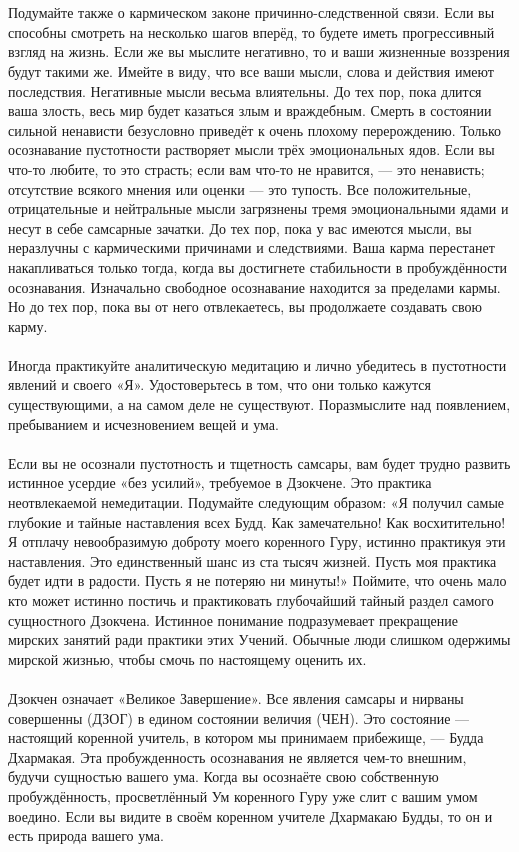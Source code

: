 \\ \\ Подумайте также о кармическом законе причинно-следственной связи. Если вы способны смотреть на несколько шагов вперёд, то будете иметь прогрессивный взгляд на жизнь. Если же вы мыслите негативно, то и ваши жизненные воззрения будут такими же. Имейте в виду, что все ваши мысли, слова и действия имеют последствия. Негативные мысли весьма влиятельны. До тех пор, пока длится ваша злость, весь мир будет казаться злым и враждебным. Смерть в состоянии сильной ненависти безусловно приведёт к очень плохому перерождению. Только осознавание пустотности растворяет мысли трёх эмоциональных ядов. Если вы что-то любите, то это страсть; если вам что-то не нравится, — это ненависть; отсутствие всякого мнения или оценки — это тупость. Все положительные, отрицательные и нейтральные мысли загрязнены тремя эмоциональными ядами и несут в себе самсарные зачатки. До тех пор, пока у вас имеются мысли, вы неразлучны с кармическими причинами и следствиями. Ваша карма перестанет накапливаться только тогда, когда вы достигнете стабильности в пробуждённости осознавания. Изначально свободное осознавание находится за пределами кармы. Но до тех пор, пока вы от него отвлекаетесь, вы продолжаете создавать свою карму.
\\ \\ Иногда практикуйте аналитическую медитацию и лично убедитесь в пустотности явлений и своего «Я». Удостоверьтесь в том, что они только кажутся существующими, а на самом деле не существуют. Поразмыслите над появлением, пребыванием и исчезновением вещей и ума.
\\ \\ Если вы не осознали пустотность и тщетность самсары, вам будет трудно развить истинное усердие «без усилий», требуемое в Дзокчене. Это практика неотвлекаемой немедитации. Подумайте следующим образом: «Я получил самые глубокие и тайные наставления всех Будд. Как замечательно! Как восхитительно! Я отплачу невообразимую доброту моего коренного Гуру, истинно практикуя эти наставления. Это единственный шанс из ста тысяч жизней. Пусть моя практика будет идти в радости. Пусть я не потеряю ни минуты!» Поймите, что очень мало кто может истинно постичь и практиковать глубочайший тайный раздел самого сущностного Дзокчена. Истинное понимание подразумевает прекращение мирских занятий ради практики этих Учений. Обычные люди слишком одержимы мирской жизнью, чтобы смочь по настоящему оценить их.
\\ \\ Дзокчен означает «Великое Завершение». Все явления самсары и нирваны совершенны (ДЗОГ) в едином состоянии величия (ЧЕН). Это состояние — настоящий коренной учитель, в котором мы принимаем прибежище, — Будда Дхармакая. Эта пробужденность осознавания не является чем-то внешним, будучи сущностью вашего ума. Когда вы осознаёте свою собственную пробуждённость, просветлённый Ум коренного Гуру уже слит с вашим умом воедино. Если вы видите в своём коренном учителе Дхармакаю Будды, то он и есть природа вашего ума.

